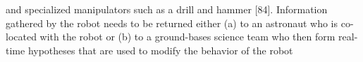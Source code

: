 and specialized manipulators such as a drill and hammer [84]. Information gathered by the robot needs to be returned either (a) to an astronaut who is co-located with the robot or (b) to a ground-bases science team who then form real-time hypotheses that are used to modify the behavior of the robot

